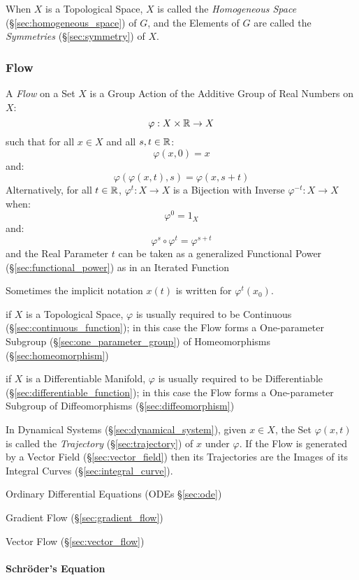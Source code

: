 When $X$ is a Topological Space, $X$ is called the \emph{Homogeneous Space}
(\S\ref{sec:homogeneous_space}) of $G$, and the Elements of $G$ are called the
\emph{Symmetries} (\S\ref{sec:symmetry}) of $X$.



\subsubsection{Flow}\label{sec:flow}

A \emph{Flow} on a Set $X$ is a Group Action of the Additive Group of Real
Numbers on $X$:
\[
  \varphi : X \times \mathbb{R} \rightarrow X
\]
such that for all $x \in X$ and all $s,t \in \mathbb{R}$:
\[
  \varphi(x,0) = x
\]
and:
\[
  \varphi(\varphi(x,t),s) = \varphi(x,s+t)
\]
Alternatively, for all $t \in \mathbb{R}$, $\varphi^t : X \rightarrow X$ is a
Bijection with Inverse $\varphi^{-t} : X \rightarrow X$ when:
\[
  \varphi^0 = 1_X
\]
and:
\[
  \varphi^s \circ \varphi^t = \varphi^{s + t}
\]
and the Real Parameter $t$ can be taken as a generalized Functional Power
(\S\ref{sec:functional_power}) as in an Iterated Function

Sometimes the implicit notation $x(t)$ is written for $\varphi^t(x_0)$.

if $X$ is a Topological Space, $\varphi$ is usually required to be Continuous
(\S\ref{sec:continuous_function}); in this case the Flow forms a One-parameter
Subgroup (\S\ref{sec:one_parameter_group}) of Homeomorphisms
(\S\ref{sec:homeomorphism})

if $X$ is a Differentiable Manifold, $\varphi$ is usually required to be
Differentiable (\S\ref{sec:differentiable_function}); in this case the Flow
forms a One-parameter Subgroup of Diffeomorphisms (\S\ref{sec:diffeomorphism})

In Dynamical Systems (\S\ref{sec:dynamical_system}), given $x \in X$, the Set
$\varphi(x,t)$ is called the \emph{Trajectory} (\S\ref{sec:trajectory}) of $x$
under $\varphi$. If the Flow is generated by a Vector Field
(\S\ref{sec:vector_field}) then its Trajectories are the Images of its Integral
Curves (\S\ref{sec:integral_curve}).

\fist Ordinary Differential Equations (ODEs \S\ref{sec:ode})

\fist Gradient Flow (\S\ref{sec:gradient_flow})

\fist Vector Flow (\S\ref{sec:vector_flow})



\paragraph{Schr\"oder's Equation}\label{sec:schroders_equation}\hfill


